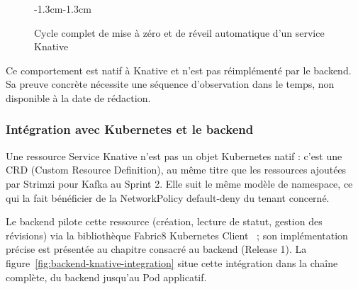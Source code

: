 \begin{figure}[H]
\begin{adjustwidth}{-1.3cm}{-1.3cm}
\caption{Cycle complet de mise à zéro et de réveil automatique d'un service Knative}
\label{fig:scale-to-zero}
\end{adjustwidth}
\end{figure}

Ce comportement est natif à Knative et n'est pas réimplémenté par le backend. Sa preuve concrète nécessite une séquence d'observation dans le temps, non disponible à la date de rédaction.


\subsubsection{Intégration avec Kubernetes et le backend}

Une ressource Service Knative n'est pas un objet Kubernetes natif : c'est une CRD (Custom Resource Definition), au même titre que les ressources ajoutées par Strimzi pour Kafka au Sprint 2. Elle suit le même modèle de namespace, ce qui la fait bénéficier de la NetworkPolicy default-deny du tenant concerné.

Le backend pilote cette ressource (création, lecture de statut, gestion des révisions) via la bibliothèque Fabric8 Kubernetes Client~\cite{Fabric8Doc} ; son implémentation précise est présentée au chapitre consacré au backend (Release 1). La figure~\ref{fig:backend-knative-integration} situe cette intégration dans la chaîne complète, du backend jusqu'au Pod applicatif.

